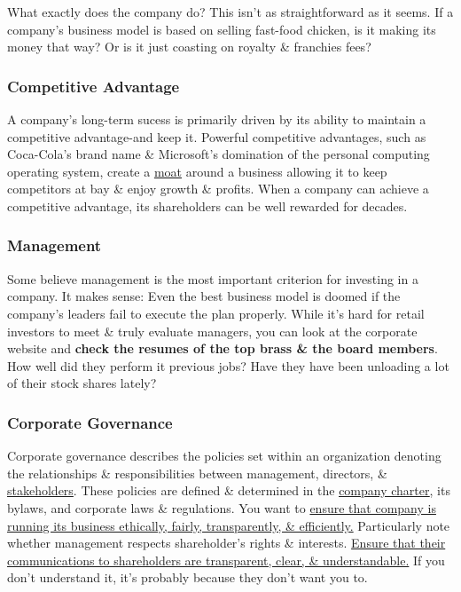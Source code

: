 \documentclass{article}
\begin{document}
	What exactly does the company do? This isn't as straightforward as it seems. If a company's business model is based on selling fast-food chicken, is it making its money that way? Or is it just
	coasting on royalty \& franchies fees?

	\subsubsection{Competitive Advantage}

	A company's long-term sucess is primarily driven by its ability to maintain a competitive advantage-and keep it. Powerful competitive advantages, such as Coca-Cola's brand name \& Microsoft's
	domination of the personal computing operating system, create a \href{https://www.investopedia.com/ask/answers/05/economicmoat.asp}{moat} around a business allowing it to keep competitors at bay
	\& enjoy growth \& profits. When a company can achieve a competitive advantage, its shareholders can be well rewarded for decades. \newline

	\subsubsection{Management}

	Some believe management is the most important criterion for investing in a company. It makes sense: Even the best business model is doomed if the company's leaders fail to execute the plan
	properly. While it's hard for retail investors to meet \& truly evaluate managers, you can look at the corporate website and {\bf check the resumes of the top brass \& the board members}. How
	well did they perform it previous jobs? Have they have been unloading a lot of their stock shares lately? \newline

	\subsubsection{Corporate Governance}

	Corporate governance describes the policies set within an organization denoting the relationships \& responsibilities between management, directors, \& \href{https://www.investopedia.com/terms/f/fundamentalanalysis.asp}{stakeholders}.
	These policies are defined \& determined in the \underline{\href{https://www.investopedia.com/terms/c/corporatecharter.asp}{company charter}}, its bylaws, and corporate laws \& regulations.
	You want to \underline{ensure that company is running its business ethically, fairly, transparently, \& efficiently.} Particularly note whether management respects shareholder's rights \&
	interests. \underline{Ensure that their communications to shareholders are transparent, clear, \& understandable.} If you don't understand it, it's probably because they don't want you to. \newline
\end{document}
